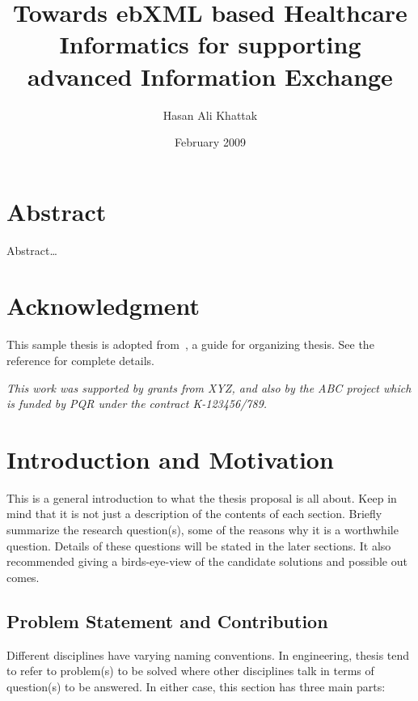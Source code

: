 \documentclass[12pt,a4paper,oneside]{book} %
\title{Towards ebXML based Healthcare Informatics for supporting advanced Information Exchange}
\author{Hasan Ali Khattak}
\date{February 2009}
\begin{document}
\maketitle


\chapter*{Abstract}
Abstract\ldots

\certificateoforiginality

\chapter*{Acknowledgment}
This sample thesis is adopted from~\cite{Chinneck99}, a guide for organizing
thesis. See the reference for complete details.

\begin{center}
\emph{This work was supported by grants from XYZ, and also by the 
ABC project which is funded by PQR under the contract K-123456/789.}
\end{center}


\tableofcontents
\listoffigures
\listoftables

\resetpagenumbering



\chapter{Introduction and Motivation}
\label{c-intro}

This is a general introduction to what the thesis proposal is all about. Keep
in mind that it is not just a description of the contents of each section.
Briefly summarize the research question(s), some of the reasons why it is a
worthwhile question. Details of these questions will be stated in the later
sections. It also recommended giving a birds-eye-view of the candidate
solutions and possible out comes.


\section{Problem Statement and Contribution}
Different disciplines have varying naming conventions. In engineering, thesis
tend to refer to problem(s) to be solved where other disciplines talk in terms of
question(s) to be answered. In either case, this section has three main parts:
\end{document}
